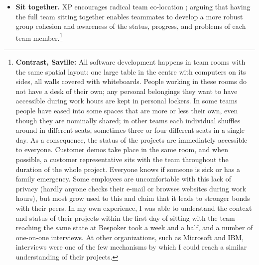 \begin{itemize}
\item \textbf{Sit together.} XP encourages radical team co-location \cite{Teasley2002}; arguing that having the full team sitting together enables teammates to develop a more robust group cohesion and awareness of the status, progress, and problems of each team member.\footnote{\textbf{Contrast, Saville:} All software development happens in team rooms with the same spatial layout: one large table in the centre with computers on its sides, all walls covered with whiteboards. People working in these rooms do not have a desk of their own; any personal belongings they want to have accessible during work hours are kept in personal lockers. In some teams people have eased into some spaces that are more or less their own, even though they are nominally shared; in other teams each individual shuffles around in different seats, sometimes three or four different seats in a single day. As a consequence, the status of the projects are immediately accessible to everyone. Customer demos take place in the same room, and when possible, a customer representative sits with the team throughout the duration of the whole project. Everyone knows if someone is sick or has a family emergency. Some employees are uncomfortable with this lack of privacy (hardly anyone checks their e-mail or browses websites during work hours), but most grow used to this and claim that it leads to stronger bonds with their peers. In my own experience, I was able to understand the context and status of their projects within the first day of sitting with the team---reaching the same state at Bespoker took a week and a half, and a number of one-on-one interviews. At other organizations, such as Microsoft and IBM, interviews were one of the few mechanisms by which I could reach a similar understanding of their projects.}


\end{itemize}
